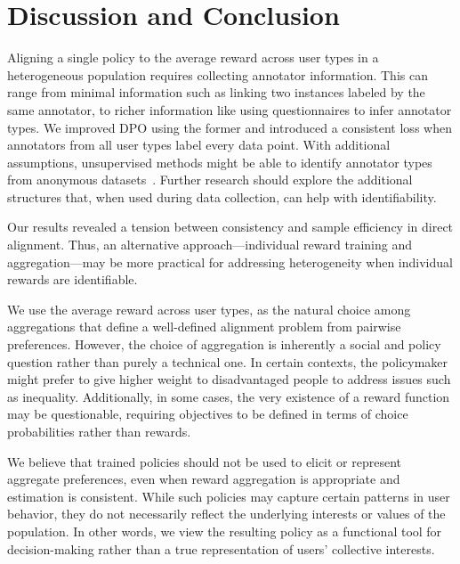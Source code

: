 \section{Discussion and Conclusion}
\label{sec:conclusion}

Aligning a single policy to the average reward across user types in a heterogeneous population requires collecting annotator information. This can range from minimal information such as linking two instances labeled by the same annotator, to richer information like using questionnaires to infer annotator types. We improved DPO using the former and introduced a consistent loss when annotators from all user types label every data point. With additional assumptions, unsupervised methods might be able to identify annotator types from anonymous datasets~\citep{zhang2022identifiability}.
Further research should explore the additional structures that, when used during data collection, can help with identifiability.

Our results revealed a tension between consistency and sample efficiency in direct alignment. Thus, an alternative approach---individual reward training and aggregation---may be more practical for addressing heterogeneity when individual rewards are identifiable.

\ifarxiv
We use the average reward across user types, as the natural choice among aggregations that define a well-defined alignment problem from pairwise preferences. However, the choice of aggregation is inherently a social and policy question rather than purely a technical one.
In certain contexts, the policymaker might prefer to give higher weight to disadvantaged people to address issues such as inequality. Additionally, in some cases, the very existence of a reward function may be questionable, requiring objectives to be defined in terms of choice probabilities rather than rewards.

We believe that trained policies should not be used to elicit or represent aggregate preferences, even when reward aggregation is appropriate and estimation is consistent. While such policies may capture certain patterns in user behavior, they do not necessarily reflect the underlying interests or values of the population. In other words, we view the resulting policy as a functional tool for decision-making rather than a true representation of users' collective interests.
\fi

